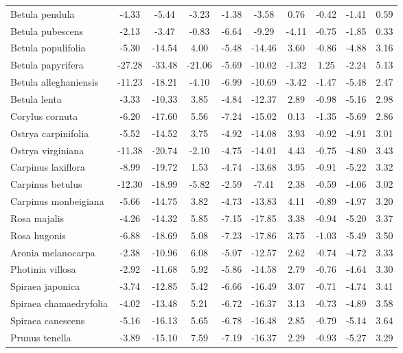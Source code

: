 \documentclass[11pt]{article}
\begin{document}
\begin{longtable}{p{1.50in}c{0.32in}c{0.32in}c{0.32in}c{0.32in}c{0.32in}c{0.32in}c{0.2in}c{0.3in}c{0.1in}}
  Betula pendula & -4.33 & -5.44 & -3.23 & -1.38 & -3.58 & 0.76 & -0.42 & -1.41 & 0.59 \\ 
  Betula pubescens & -2.13 & -3.47 & -0.83 & -6.64 & -9.29 & -4.11 & -0.75 & -1.85 & 0.33 \\ 
  Betula populifolia & -5.30 & -14.54 & 4.00 & -5.48 & -14.46 & 3.60 & -0.86 & -4.88 & 3.16 \\ 
  Betula papyrifera & -27.28 & -33.48 & -21.06 & -5.69 & -10.02 & -1.32 & 1.25 & -2.24 & 5.13 \\ 
  Betula alleghaniensis & -11.23 & -18.21 & -4.10 & -6.99 & -10.69 & -3.42 & -1.47 & -5.48 & 2.47 \\ 
  Betula lenta & -3.33 & -10.33 & 3.85 & -4.84 & -12.37 & 2.89 & -0.98 & -5.16 & 2.98 \\ 
  Corylus cornuta & -6.20 & -17.60 & 5.56 & -7.24 & -15.02 & 0.13 & -1.35 & -5.69 & 2.86 \\ 
  Ostrya carpinifolia & -5.52 & -14.52 & 3.75 & -4.92 & -14.08 & 3.93 & -0.92 & -4.91 & 3.01 \\ 
  Ostrya virginiana & -11.38 & -20.74 & -2.10 & -4.75 & -14.01 & 4.43 & -0.75 & -4.80 & 3.43 \\ 
  Carpinus laxiflora & -8.99 & -19.72 & 1.53 & -4.74 & -13.68 & 3.95 & -0.91 & -5.22 & 3.32 \\ 
  Carpinus betulus & -12.30 & -18.99 & -5.82 & -2.59 & -7.41 & 2.38 & -0.59 & -4.06 & 3.02 \\ 
  Carpinus monbeigiana & -5.66 & -14.75 & 3.82 & -4.73 & -13.83 & 4.11 & -0.89 & -4.97 & 3.20 \\ 
  Rosa majalis & -4.26 & -14.32 & 5.85 & -7.15 & -17.85 & 3.38 & -0.94 & -5.20 & 3.37 \\ 
  Rosa hugonis & -6.88 & -18.69 & 5.08 & -7.23 & -17.86 & 3.75 & -1.03 & -5.49 & 3.50 \\ 
  Aronia melanocarpa & -2.38 & -10.96 & 6.08 & -5.07 & -12.57 & 2.62 & -0.74 & -4.72 & 3.33 \\ 
  Photinia villosa & -2.92 & -11.68 & 5.92 & -5.86 & -14.58 & 2.79 & -0.76 & -4.64 & 3.30 \\ 
  Spiraea japonica & -3.74 & -12.85 & 5.42 & -6.66 & -16.49 & 3.07 & -0.71 & -4.74 & 3.41 \\ 
  Spiraea chamaedryfolia & -4.02 & -13.48 & 5.21 & -6.72 & -16.37 & 3.13 & -0.73 & -4.89 & 3.58 \\ 
  Spiraea canescens & -5.16 & -16.13 & 5.65 & -6.78 & -16.48 & 2.85 & -0.79 & -5.14 & 3.64 \\ 
  Prunus tenella & -3.89 & -15.10 & 7.59 & -7.19 & -16.37 & 2.29 & -0.93 & -5.27 & 3.29 \\ 

\end{longtable}
\end{document}
